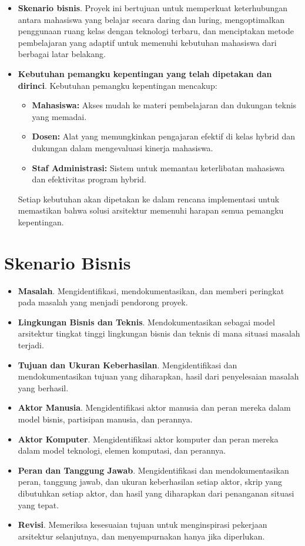 \begin{itemize}
	\item \textbf{Skenario bisnis}. Proyek ini bertujuan untuk memperkuat keterhubungan antara mahasiswa yang belajar secara daring dan luring, mengoptimalkan penggunaan ruang kelas dengan teknologi terbaru, dan menciptakan metode pembelajaran yang adaptif untuk memenuhi kebutuhan mahasiswa dari berbagai latar belakang.
	
	\item \textbf{Kebutuhan pemangku kepentingan yang telah dipetakan dan dirinci}. Kebutuhan pemangku kepentingan mencakup:
	\begin{itemize}
		\item \textbf{Mahasiswa:} Akses mudah ke materi pembelajaran dan dukungan teknis yang memadai.
		\item \textbf{Dosen:} Alat yang memungkinkan pengajaran efektif di kelas hybrid dan dukungan dalam mengevaluasi kinerja mahasiswa.
		\item \textbf{Staf Administrasi:} Sistem untuk memantau keterlibatan mahasiswa dan efektivitas program hybrid.
	\end{itemize}
	Setiap kebutuhan akan dipetakan ke dalam rencana implementasi untuk memastikan bahwa solusi arsitektur memenuhi harapan semua pemangku kepentingan.
\end{itemize}

\section{Skenario Bisnis}
\label{sec:skenario_bisnis}
\begin{itemize}
	\item \textbf{Masalah}. Mengidentifikasi, mendokumentasikan, dan memberi peringkat pada masalah yang menjadi pendorong proyek.
	\item \textbf{Lingkungan Bisnis dan Teknis}. Mendokumentasikan sebagai model arsitektur tingkat tinggi lingkungan bisnis dan teknis di mana situasi masalah terjadi.
	\item \textbf{Tujuan dan Ukuran Keberhasilan}. Mengidentifikasi dan mendokumentasikan tujuan yang diharapkan, hasil dari penyelesaian masalah yang berhasil.
	\item \textbf{Aktor Manusia}. Mengidentifikasi aktor manusia dan peran mereka dalam model bisnis, partisipan manusia, dan perannya.
	\item \textbf{Aktor Komputer}. Mengidentifikasi aktor komputer dan peran mereka dalam model teknologi, elemen komputasi, dan perannya.
	\item \textbf{Peran dan Tanggung Jawab}. Mengidentifikasi dan mendokumentasikan peran, tanggung jawab, dan ukuran keberhasilan setiap aktor, skrip yang dibutuhkan setiap aktor, dan hasil yang diharapkan dari penanganan situasi yang tepat.
	\item \textbf{Revisi}. Memeriksa kesesuaian tujuan untuk menginspirasi pekerjaan arsitektur selanjutnya, dan menyempurnakan hanya jika diperlukan.
\end{itemize}

